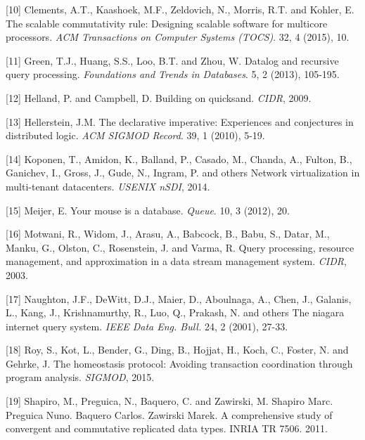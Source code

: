 \documentclass[b5paper,11pt,twoside,openright]{book}
\begin{document}
\leavevmode\hypertarget{ref-clements2015scalable}{}%
{[}10{]} Clements, A.T., Kaashoek, M.F., Zeldovich, N., Morris, R.T. and
Kohler, E. The scalable commutativity rule: Designing scalable software
for multicore processors. \emph{ACM Transactions on Computer Systems
  (TOCS)}. 32, 4 (2015), 10.

\leavevmode\hypertarget{ref-green2013datalog}{}%
{[}11{]} Green, T.J., Huang, S.S., Loo, B.T. and Zhou, W. Datalog and
recursive query processing. \emph{Foundations and Trends in Databases}.
5, 2 (2013), 105-195.

\leavevmode\hypertarget{ref-quicksand}{}%
{[}12{]} Helland, P. and Campbell, D. Building on quicksand.
\emph{CIDR}, 2009.

\leavevmode\hypertarget{ref-hellerstein2010declarative}{}%
{[}13{]} Hellerstein, J.M. The declarative imperative: Experiences and
conjectures in distributed logic. \emph{ACM SIGMOD Record}. 39, 1
(2010), 5-19.

\leavevmode\hypertarget{ref-koponen2014network}{}%
{[}14{]} Koponen, T., Amidon, K., Balland, P., Casado, M., Chanda, A.,
Fulton, B., Ganichev, I., Gross, J., Gude, N., Ingram, P. and others
Network virtualization in multi-tenant datacenters. \emph{USENIX nSDI},
2014.

\leavevmode\hypertarget{ref-meijer2012your}{}%
{[}15{]} Meijer, E. Your mouse is a database. \emph{Queue}. 10, 3
(2012), 20.

\leavevmode\hypertarget{ref-motwani2003query}{}%
{[}16{]} Motwani, R., Widom, J., Arasu, A., Babcock, B., Babu, S.,
Datar, M., Manku, G., Olston, C., Rosenstein, J. and Varma, R. Query
processing, resource management, and approximation in a data stream
management system. \emph{CIDR}, 2003.

\leavevmode\hypertarget{ref-naughton2001niagara}{}%
{[}17{]} Naughton, J.F., DeWitt, D.J., Maier, D., Aboulnaga, A., Chen,
J., Galanis, L., Kang, J., Krishnamurthy, R., Luo, Q., Prakash, N. and
others The niagara internet query system. \emph{IEEE Data Eng. Bull.}
24, 2 (2001), 27-33.

\leavevmode\hypertarget{ref-roy2015homeostasis}{}%
{[}18{]} Roy, S., Kot, L., Bender, G., Ding, B., Hojjat, H., Koch, C.,
Foster, N. and Gehrke, J. The homeostasis protocol: Avoiding transaction
coordination through program analysis. \emph{SIGMOD}, 2015.

\leavevmode\hypertarget{ref-crdt}{}%
{[}19{]} Shapiro, M., Preguica, N., Baquero, C. and Zawirski, M. Shapiro
Marc. Preguica Nuno. Baquero Carlos. Zawirski Marek. A comprehensive
study of convergent and commutative replicated data types. INRIA TR
7506. 2011.
\end{document}
